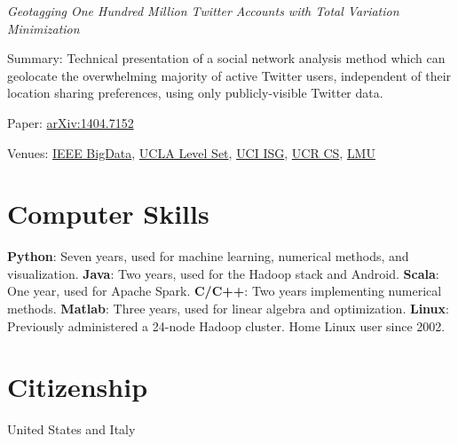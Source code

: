 \documentclass[margin,line]{res}
\newenvironment{list1}{
  \begin{list}{\ding{113}}{%
      \setlength{\itemsep}{0.0in}
      \setlength{\parsep}{0in} \setlength{\parskip}{0in}
      \setlength{\topsep}{0in} \setlength{\partopsep}{0in}
      \setlength{\leftmargin}{0.17in}}}{\end{list}}
\begin{document}
\begin{resume}
{\it Geotagging One Hundred Million Twitter Accounts with Total Variation Minimization}
\begin{list1}
\item [] Summary: Technical presentation of a social network analysis method which can geolocate the overwhelming majority of active Twitter users, independent of their location sharing preferences, using only publicly-visible Twitter data.
\item [] Paper: \href{https://arxiv.org/abs/1404.7152}{arXiv:1404.7152}
\item [] Venues: \href{http://cci.drexel.edu/bigdata/bigdata2014/}{IEEE BigData}, \href{http://papyrus.math.ucla.edu/seminars/display.php?&id=831425}{UCLA Level Set}, \href{http://calendar.ics.uci.edu/event.php?calendar=1&category=&event=1386&date=2015-01-16}{UCI ISG}, \href{http://wwwcontent.cs.ucr.edu/department/eventlookup/491}{UCR CS}, \href{http://myweb.lmu.edu/yma/LMUMathSeminar.htm}{LMU}
\end{list1}

\section{\sc Computer Skills}

{\bf Python}: Seven years, used for machine learning, numerical methods, and visualization.
{\bf Java}: Two years, used for the Hadoop stack and Android.
{\bf Scala}: One year, used for Apache Spark.
{\bf C/C++}: Two years implementing numerical methods.
{\bf Matlab}: Three years, used for linear algebra and optimization.
{\bf Linux}: Previously administered a 24-node Hadoop cluster. Home Linux user since 2002.

\section{\sc Citizenship}
United States and Italy

\end{resume}
\end{document}
